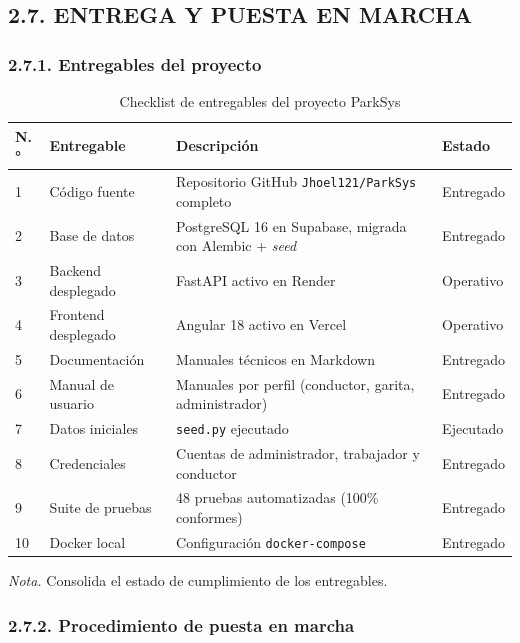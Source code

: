 \clearpage
\subsection{2.7. ENTREGA Y PUESTA EN MARCHA}

\subsubsection{2.7.1. Entregables del proyecto}

\begin{table}[htbp]
\caption{Checklist de entregables del proyecto ParkSys}
\label{tab:checklist_entregables}
\begin{tabular}{@{}p{1cm} p{3.5cm} p{7cm} p{2.5cm}@{}}
\toprule
\textbf{N.°} & \textbf{Entregable} & \textbf{Descripción} & \textbf{Estado} \\
\midrule
1 & Código fuente & Repositorio GitHub \texttt{Jhoel121/ParkSys} completo & Entregado \\
2 & Base de datos & PostgreSQL 16 en Supabase, migrada con Alembic + \textit{seed} & Entregado \\
3 & Backend desplegado & FastAPI activo en Render & Operativo \\
4 & Frontend desplegado & Angular 18 activo en Vercel & Operativo \\
5 & Documentación & Manuales técnicos en Markdown & Entregado \\
6 & Manual de usuario & Manuales por perfil (conductor, garita, administrador) & Entregado \\
7 & Datos iniciales & \texttt{seed.py} ejecutado & Ejecutado \\
8 & Credenciales & Cuentas de administrador, trabajador y conductor & Entregado \\
9 & Suite de pruebas & 48 pruebas automatizadas (100\% conformes) & Entregado \\
10 & Docker local & Configuración \texttt{docker-compose} & Entregado \\
\bottomrule
\end{tabular}
\par\vspace{0.2cm}
\textit{Nota.} Consolida el estado de cumplimiento de los entregables.
\end{table}

\clearpage
\subsubsection{2.7.2. Procedimiento de puesta en marcha}

